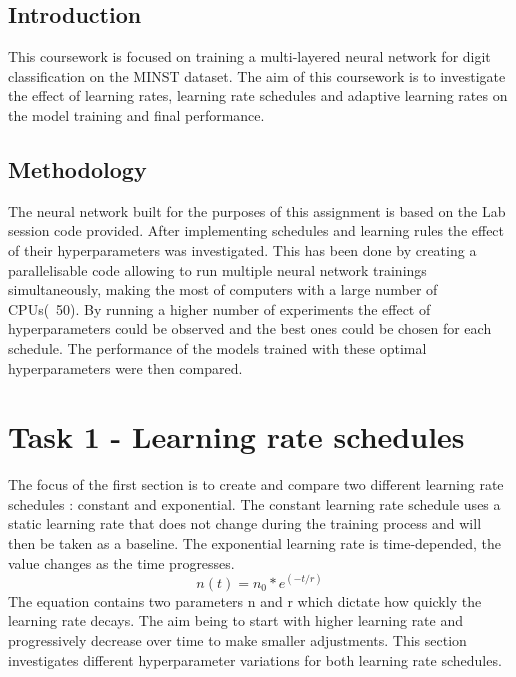 \documentclass[12pt]{article}
\begin{document}
\maketitle


\subsection*{Introduction}
This coursework is focused on training a multi-layered neural network for digit classification on the MINST dataset. The aim of this coursework is to investigate the effect of learning rates, learning rate schedules and adaptive learning rates on the model training and final performance.

\subsection*{Methodology}
The neural network built for the purposes of this assignment is based on the Lab session code provided. After implementing schedules and learning rules the effect of their hyperparameters was investigated. This has been done by creating a parallelisable code allowing to run multiple neural network trainings simultaneously, making the most of computers with a large number of CPUs(~50). By running a higher number of experiments the effect of hyperparameters could be observed and the best ones could be chosen for each schedule. The performance of the models trained with these optimal hyperparameters were then compared.



\section*{Task 1 - Learning rate schedules}

The focus of the first section is to create and compare two different learning rate schedules : constant and exponential. The constant learning rate schedule uses a static learning rate that does not change during the training process and will then be taken as a baseline. The exponential learning rate is time-depended, the value changes as the time progresses. 
\[ n(t) = n_0*e^{(-t/r)}\] 
The equation contains two parameters n and r which dictate how quickly the learning rate decays. The aim being to start with higher learning rate and progressively decrease over time to make smaller adjustments. This section investigates different hyperparameter variations for both learning rate schedules.
\end{document}
